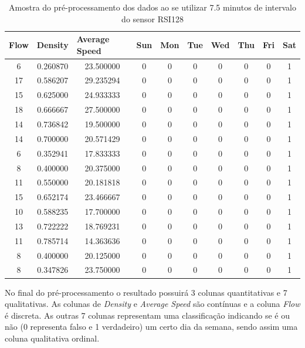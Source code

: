 \begin{table}[H]
    \begin{tabular}{cccccccccc}
    \toprule
    \multicolumn{1}{l}{\textbf{Flow}} & \multicolumn{1}{l}{\textbf{Density}} & \multicolumn{1}{l}{\textbf{Average Speed}} & \multicolumn{1}{l}{\textbf{Sun}} &
    \multicolumn{1}{l}{\textbf{Mon}} & \multicolumn{1}{l}{\textbf{Tue}} & \multicolumn{1}{l}{\textbf{Wed}} & \multicolumn{1}{l}{\textbf{Thu}} &
    \multicolumn{1}{l}{\textbf{Fri}} &
    \multicolumn{1}{l}{\textbf{Sat}} \\
    \midrule
     6 & 0.260870 & 23.500000 & 0 & 0 & 0 & 0 & 0 & 0 & 1 \\
    \midrule
    17 & 0.586207 & 29.235294 & 0 & 0 & 0 & 0 & 0 & 0 & 1 \\
    \midrule
    15 & 0.625000 & 24.933333 & 0 & 0 & 0 & 0 & 0 & 0 & 1 \\
    \midrule
    18 & 0.666667 & 27.500000 & 0 & 0 & 0 & 0 & 0 & 0 & 1 \\
    \midrule
    14 & 0.736842 & 19.500000 & 0 & 0 & 0 & 0 & 0 & 0 & 1 \\
    \midrule
    14 & 0.700000 & 20.571429 & 0 & 0 & 0 & 0 & 0 & 0 & 1 \\
    \midrule
     6 & 0.352941 & 17.833333 & 0 & 0 & 0 & 0 & 0 & 0 & 1 \\
    \midrule
     8 & 0.400000 & 20.375000 & 0 & 0 & 0 & 0 & 0 & 0 & 1 \\
    \midrule
    11 & 0.550000 & 20.181818 & 0 & 0 & 0 & 0 & 0 & 0 & 1 \\
    \midrule
    15 & 0.652174 & 23.466667 & 0 & 0 & 0 & 0 & 0 & 0 & 1 \\
    \midrule
    10 & 0.588235 & 17.700000 & 0 & 0 & 0 & 0 & 0 & 0 & 1 \\
    \midrule
    13 & 0.722222 & 18.769231 & 0 & 0 & 0 & 0 & 0 & 0 & 1 \\
    \midrule
    11 & 0.785714 & 14.363636 & 0 & 0 & 0 & 0 & 0 & 0 & 1 \\
    \midrule
     8 & 0.400000 & 20.125000 & 0 & 0 & 0 & 0 & 0 & 0 & 1 \\
    \midrule
     8 & 0.347826 & 23.750000 & 0 & 0 & 0 & 0 & 0 & 0 & 1 \\
    \bottomrule
    \end{tabular}
    \label{table:data_pre}
    \caption{Amostra do pré-processamento dos dados ao se utilizar 7.5 minutos de intervalo do sensor RSI128}
\end{table}

No final do pré-processamento o resultado possuirá 3 colunas quantitativas e 7 qualitativas. As colunas de \textit{Density} e \textit{Average Speed} são contínuas e a coluna \textit{Flow} é discreta. As outras 7 colunas representam uma classificação indicando se é ou não (0 representa falso e 1 verdadeiro) um certo dia da semana, sendo assim uma coluna qualitativa ordinal.

